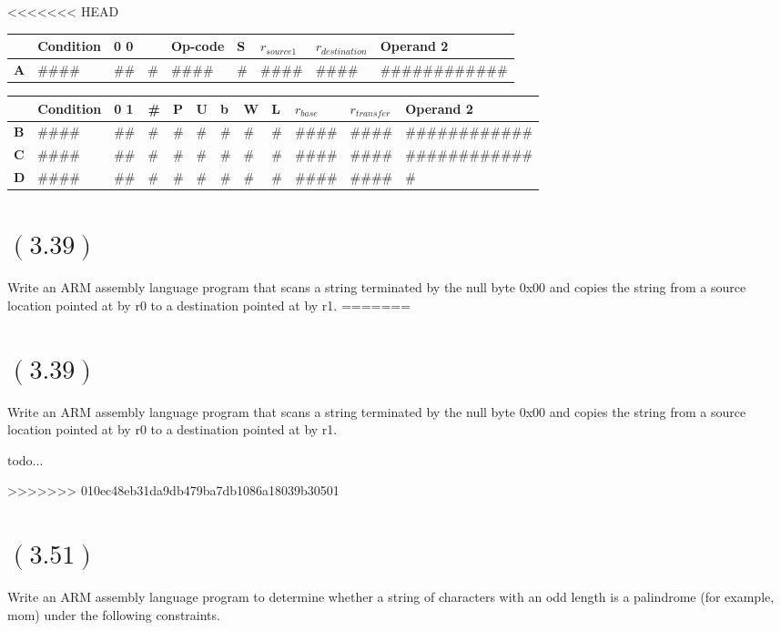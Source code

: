 \documentclass[letterpaper,12pt,titlepage]{article}
\begin{document}
<<<<<<< HEAD
\begin{center}
\begin{tabular}{| l | l | l | l | l | l | l | l | l | }
\hline 
& Condition & 0 0 & & Op-code & S & $r_{source1}$ & $r_{destination}$ & Operand 2 \\
\hline 
\textbf{A}& \#\#\#\# & \#\# & \# & \#\#\#\# &\# & \#\#\#\# &\#\#\#\# & \#\#\#\#\#\#\#\#\#\#\#\#  \\ 
\hline 
\end{tabular}


\begin{tabular}{| l | l | l | l | l | l | l | l | l | l | l | l | }
\hline 
& Condition & 0 1 & \# & P & U & b &W & L & $r_{base}$ & $r_{transfer}$ & Operand 2 \\
\hline
\textbf{B}& \#\#\#\# & \#\# & \# & \# & \# & \# & \# &\# & \#\#\#\# &\#\#\#\# & \#\#\#\#\#\#\#\#\#\#\#\#  \\
\hline
\textbf{C}& \#\#\#\# & \#\# & \# & \# & \# & \# & \# &\# & \#\#\#\# &\#\#\#\# & \#\#\#\#\#\#\#\#\#\#\#\#  \\
\hline
\textbf{D}& \#\#\#\# & \#\# & \# & \# & \# & \# & \# &\# & \#\#\#\# &\#\#\#\# & \#%
\hline
\end{tabular}
\end{center}


\section*{$(3.39)$} Write an ARM assembly language program that scans a string terminated by the null byte 0x00 and copies the string from a source location pointed at by r0 to a destination pointed at by r1.
=======
\section*{$(3.39)$} Write an ARM assembly language program that scans a string terminated by the null byte 0x00 and copies the string from a source location pointed at by r0 to a destination pointed at by r1. 

\begin{mdframed}[style=MyFrame]
todo...
\end{mdframed}
>>>>>>> 010ec48eb31da9db479ba7db1086a18039b30501

\section*{$(3.51)$} Write an ARM assembly language program to determine whether a string of characters with an odd length is a palindrome (for example, mom) under the following constraints.
\end{document}
